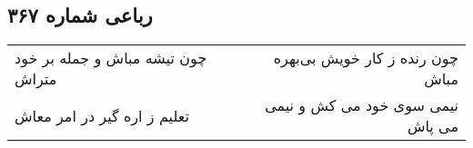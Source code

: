 \begin{center}
\section*{رباعی شماره ۳۶۷}
\label{sec:sh367}
\begin{longtable}{l p{0.5cm} r}
چون تیشه مباش و جمله بر خود متراش
&&
چون رنده ز کار خویش بی‌بهره مباش
\\
تعلیم ز اره گیر در امر معاش
&&
نیمی سوی خود می کش و نیمی می پاش
\\
\end{longtable}
\end{center}
